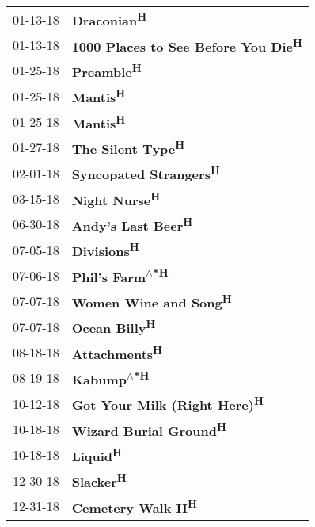 \begin{supertabular}{p{0.25\columnwidth}p{0.75\columnwidth}}
 01-13-18 &                          \textbf{Draconian\textsuperscript{H}} \\
 01-13-18 &  \textbf{1000 Places to See Before You Die\textsuperscript{H}} \\
 01-25-18 &                           \textbf{Preamble\textsuperscript{H}} \\
 01-25-18 &                             \textbf{Mantis\textsuperscript{H}} \\
 01-25-18 &                             \textbf{Mantis\textsuperscript{H}} \\
 01-27-18 &                    \textbf{The Silent Type\textsuperscript{H}} \\
 02-01-18 &               \textbf{Syncopated Strangers\textsuperscript{H}} \\
 03-15-18 &                        \textbf{Night Nurse\textsuperscript{H}} \\
 06-30-18 &                   \textbf{Andy's Last Beer\textsuperscript{H}} \\
 07-05-18 &                          \textbf{Divisions\textsuperscript{H}} \\
 07-06-18 &               \textbf{Phil's Farm\textsuperscript{$\wedge$*H}} \\
 07-07-18 &                \textbf{Women Wine and Song\textsuperscript{H}} \\
 07-07-18 &                        \textbf{Ocean Billy\textsuperscript{H}} \\
 08-18-18 &                        \textbf{Attachments\textsuperscript{H}} \\
 08-19-18 &                    \textbf{Kabump\textsuperscript{$\wedge$*H}} \\
 10-12-18 &         \textbf{Got Your Milk (Right Here)\textsuperscript{H}} \\
 10-18-18 &               \textbf{Wizard Burial Ground\textsuperscript{H}} \\
 10-18-18 &                             \textbf{Liquid\textsuperscript{H}} \\
 12-30-18 &                            \textbf{Slacker\textsuperscript{H}} \\
 12-31-18 &                   \textbf{Cemetery Walk II\textsuperscript{H}} \\
\end{supertabular}
